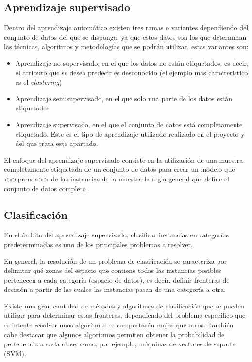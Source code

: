 \subsection{Aprendizaje supervisado}

Dentro del aprendizaje automático existen tres ramas o variantes dependiendo del
conjunto de datos del que se disponga, ya que estos datos son los que determinan
las técnicas, algoritmos y metodologías que se podrán utilizar, estas variantes
son:
\begin{itemize}
    \item Aprendizaje no supervisado, en el que los datos no están
    etiquetados, es decir, el atributo que se desea predecir es desconocido (el
    ejemplo más característico es el \textit{clustering})
    \item Aprendizaje semisupervisado, en el que solo una parte de los datos
    están etiquetados.
    \item Aprendizaje supervisado, en el que el conjunto de datos está
    completamente etiquetado. Este es el tipo de aprendizaje utilizado realizado
    en el proyecto y del que trata este apartado.
\end{itemize}

El enfoque del aprendizaje supervisado consiste en la utilización de una muestra
completamente etiquetada de un conjunto de datos para crear un modelo que
<<aprenda>> de las instancias de la muestra la regla general que define el
conjunto de datos completo \cite{learned2014introduction}.

\subsection{Clasificación}

En el ámbito del aprendizaje supervisado, clasificar instancias en categorías
predeterminadas es uno de los principales problemas a resolver.

En general, la resolución de un problema de clasificación se caracteriza por
delimitar qué zonas del espacio que contiene todas las instancias posibles
pertenecen a cada categoría (espacio de datos), es decir, definir fronteras de
decisión a partir de las cuales las instancias pasan de una categoría a otra.

Existe una gran cantidad de métodos y algoritmos de clasificación que se pueden
utilizar para determinar estas fronteras, dependiendo del problema específico
que se intente resolver unos algoritmos se comportarán mejor que otros. También
cabe destacar que algunos algoritmos permiten obtener la probabilidad de
pertenencia a cada clase, como, por ejemplo, máquinas de vectores de soporte
(SVM).

